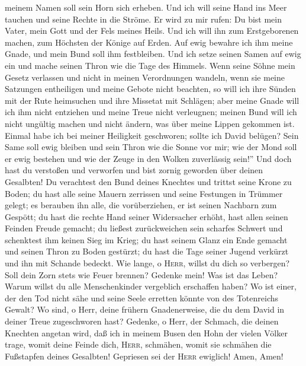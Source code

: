 meinem Namen soll sein Horn sich erheben.  Und ich will
seine Hand ins Meer tauchen und seine Rechte in die Ströme.
 Er wird zu mir rufen: Du bist mein Vater, mein Gott und
der Fels meines Heils.  Und ich will ihn zum
Erstgeborenen machen, zum Höchsten der Könige auf Erden. 
Auf ewig bewahre ich ihm meine Gnade, und mein Bund soll ihm
festbleiben.  Und ich setze seinen Samen auf ewig ein und
mache seinen Thron wie die Tage des Himmels.  Wenn seine
Söhne mein Gesetz verlassen und nicht in meinen Verordnungen wandeln,
 wenn sie meine Satzungen entheiligen und meine Gebote
nicht beachten,  so will ich ihre Sünden mit der Rute
heimsuchen und ihre Missetat mit Schlägen;  aber meine
Gnade will ich ihm nicht entziehen und meine Treue nicht verleugnen;
 meinen Bund will ich nicht ungültig machen und nicht
ändern, was über meine Lippen gekommen ist.  Einmal habe
ich bei meiner Heiligkeit geschworen; sollte ich David belügen?
 Sein Same soll ewig bleiben und sein Thron wie die Sonne
vor mir;  wie der Mond soll er ewig bestehen und wie der
Zeuge in den Wolken zuverlässig sein!''  Und doch hast du
verstoßen und verworfen und bist zornig geworden über deinen Gesalbten!
 Du verachtest den Bund deines Knechtes und trittst seine
Krone zu Boden;  du hast alle seine Mauern zerrissen und
seine Festungen in Trümmer gelegt;  es berauben ihn alle,
die vorüberziehen, er ist seinen Nachbarn zum Gespött; 
du hast die rechte Hand seiner Widersacher erhöht, hast allen seinen
Feinden Freude gemacht;  du ließest zurückweichen sein
scharfes Schwert und schenktest ihm keinen Sieg im Krieg;
 du hast seinem Glanz ein Ende gemacht und seinen Thron
zu Boden gestürzt;  du hast die Tage seiner Jugend
verkürzt und ihn mit Schande bedeckt.  Wie lange, o
\textsc{Herr}, willst du dich so verbergen? Soll dein Zorn stets wie
Feuer brennen?  Gedenke mein! Was ist das Leben? Warum
willst du alle Menschenkinder vergeblich erschaffen haben?
 Wo ist einer, der den Tod nicht sähe und seine Seele
erretten könnte von des Totenreichs Gewalt?  Wo sind, o
Herr, deine frühern Gnadenerweise, die du dem David in deiner Treue
zugeschworen hast?  Gedenke, o Herr, der Schmach, die
deinen Knechten angetan wird, daß ich in meinem Busen den Hohn der
vielen Völker trage,  womit deine Feinde dich,
\textsc{Herr}, schmähen, womit sie schmähen die Fußstapfen deines
Gesalbten!  Gepriesen sei der \textsc{Herr} ewiglich!
Amen, Amen!

